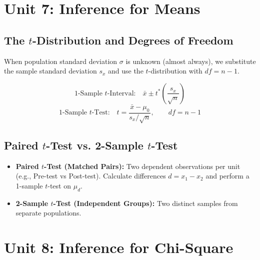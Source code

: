 ﻿\documentclass[11pt,oneside,openany]{book}
\begin{document}
\chapter{Unit 7: Inference for Means}

\section{The $t$-Distribution and Degrees of Freedom}
When population standard deviation $\sigma$ is unknown (almost always), we substitute the sample standard deviation $s_x$ and use the $t$-distribution with $df = n - 1$.

\begin{equation}
  \text{1-Sample } t\text{-Interval:} \quad \bar{x} \pm t^* \left(\frac{s_x}{\sqrt{n}}\right)
\end{equation}
\begin{equation}
  \text{1-Sample } t\text{-Test:} \quad t = \frac{\bar{x} - \mu_0}{s_x / \sqrt{n}}, \qquad df = n - 1
\end{equation}

\section{Paired $t$-Test vs. 2-Sample $t$-Test}
\begin{itemize}[leftmargin=1.2em]
  \item \textbf{Paired $t$-Test (Matched Pairs):} Two dependent observations per unit (e.g., Pre-test vs Post-test). Calculate differences $d = x_1 - x_2$ and perform a 1-sample $t$-test on $\mu_d$.
  \item \textbf{2-Sample $t$-Test (Independent Groups):} Two distinct samples from separate populations.
\end{itemize}

\chapter{Unit 8: Inference for Chi-Square}
\end{document}
